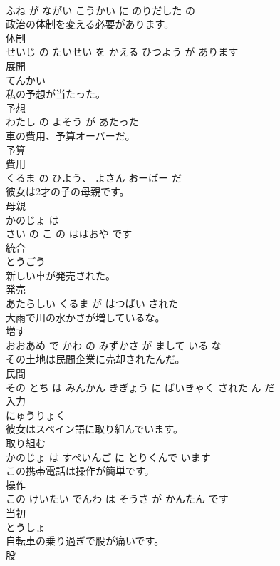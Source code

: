 \documentclass[8pt]{extreport}
\begin{document}
\begin{CJK}{UTF8}{min}
\\	ふね が ながい こうかい に のりだした の			
\\	政治の体制を変える必要があります。	
\\	体制 
\\	せいじ の たいせい を かえる ひつよう が あります			
\\	展開	
\\	てんかい			
\\	私の予想が当たった。	
\\	予想 
\\	わたし の よそう が あたった			
\\	車の費用、予算オーバーだ。	
\\	予算 
\\	費用 
\\	くるま の ひよう、 よさん おーばー だ			
\\	彼女は2才の子の母親です。	
\\	母親 
\\	かのじょ は 
\\	さい の こ の ははおや です			
\\	統合	
\\	とうごう			
\\	新しい車が発売された。	
\\	発売 
\\	あたらしい くるま が はつばい された			
\\	大雨で川の水かさが増しているな。	
\\	増す 
\\	おおあめ で かわ の みずかさ が まして いる な			
\\	その土地は民間企業に売却されたんだ。	
\\	民間 
\\	その とち は みんかん きぎょう に ばいきゃく された ん だ			
\\	入力	
\\	にゅうりょく			
\\	彼女はスペイン語に取り組んでいます。	
\\	取り組む 
\\	かのじょ は すぺいんご に とりくんで います			
\\	この携帯電話は操作が簡単です。	
\\	操作 
\\	この けいたい でんわ は そうさ が かんたん です			
\\	当初	
\\	とうしょ			
\\	自転車の乗り過ぎで股が痛いです。	
\\	股 

\end{CJK}
\end{document}
